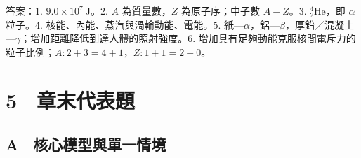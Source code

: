 \documentclass[11pt,a4paper]{article}
\begin{document}
答案：1. \(9.0\times10^7\ \mathrm J\)。2. \(A\) 為質量數，\(Z\) 為原子序；中子數 \(A-Z\)。3. \({}^4_2\mathrm{He}\)，即 \(\alpha\) 粒子。4. 核能、內能、蒸汽與渦輪動能、電能。5. 紙---\(\alpha\)，鋁---\(\beta\)，厚鉛／混凝土---\(\gamma\)；增加距離降低到達人體的照射強度。6. 增加具有足夠動能克服核間電斥力的粒子比例；\(A:2+3=4+1\)，\(Z:1+1=2+0\)。

\section{5　章末代表題}\label{ux7ae0ux672bux4ee3ux8868ux984c}

\subsection{A　核心模型與單一情境}\label{a-ux6838ux5fc3ux6a21ux578bux8207ux55aeux4e00ux60c5ux5883}
\end{document}
